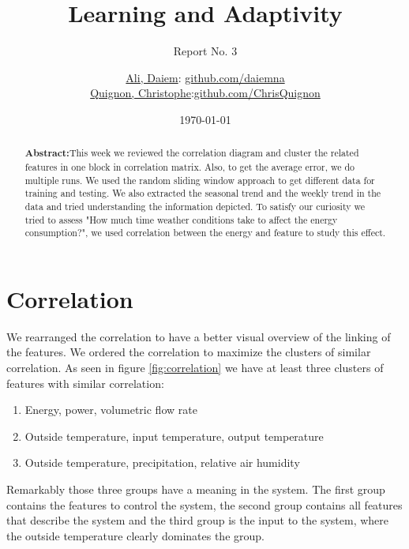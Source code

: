 \documentclass{scrartcl}
\begin{document}
\title{Learning and Adaptivity}
\subtitle{Report No. 3}
\author{
  \href{daiem.ali@smail.inf.h-brs.de}{Ali, Daiem}: \href{https://github.com/daiemna}{github.com/daiemna}\\
  \href{christophe.quignon@smail.inf.h-brs.de}{Quignon, Christophe}:\href{https://github.com/ChrisQuignon}{github.com/ChrisQuignon}
}
\date{\today}


\maketitle



\begin{abstract}
\textbf{Abstract:}This week we reviewed the correlation diagram and cluster the related features in one block in correlation matrix. Also, to get the average error, we do multiple runs. We used the random sliding window approach to get different data for training and testing. We also extracted the seasonal trend and the weekly trend in the data and tried understanding the information depicted. To satisfy our curiosity we tried to assess "How much time weather conditions take to affect the energy consumption?", we used correlation between the energy and feature to study this effect.
\end{abstract}

\section{Correlation}
\label{sec:correlation}
We rearranged the correlation to have a better visual overview of the linking of the features. We ordered the correlation to maximize the clusters of similar correlation. As seen in figure \ref{fig:correlation} we have at least three clusters of features with similar correlation:

\begin{enumerate}
\item Energy, power, volumetric flow rate
\item Outside temperature, input temperature, output temperature
\item Outside temperature, precipitation, relative air humidity
\end{enumerate}

Remarkably those three groups have a meaning in the system. The first group contains the features to control the system, the second group contains all features that describe the system and the third group is the input to the system, where the outside temperature clearly dominates the group.
\end{document}
